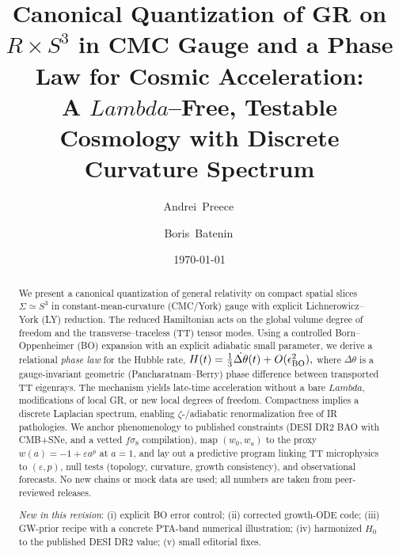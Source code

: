 \documentclass[aps,prd,twocolumn,amsmath,amssymb,nofootinbib,superscriptaddress]{revtex4-2}
\def\mathbb#1{#1}%
\def\mathcal#1{#1}%
\def\Lambda{Lambda}%
\begin{document}
\title{Canonical Quantization of GR on \texorpdfstring{$\mathbb{R}\!\times\! S^3$}{R x S3} in CMC Gauge and a Phase Law for Cosmic Acceleration:\\
A \texorpdfstring{$\Lambda$}{Lambda}--Free, Testable Cosmology with Discrete Curvature Spectrum}

\author{Andrei~Preece\,}

\author{Boris~Batenin\,}

\date{\today}

\begin{abstract}
We present a canonical quantization of general relativity on compact spatial slices $\Sigma\simeq S^3$ in constant-mean-curvature (CMC/York) gauge with explicit Lichnerowicz--York (LY) reduction. The reduced Hamiltonian acts on the global volume degree of freedom and the transverse--traceless (TT) tensor modes. Using a controlled Born--Oppenheimer (BO) expansion with an explicit adiabatic small parameter, we derive a relational \emph{phase law} for the Hubble rate,
\(
H(t)=\tfrac{1}{3}\dot{\Delta\theta}(t)+\mathcal{O}(\epsilon_{\rm BO}^2),
\)
where $\Delta\theta$ is a gauge-invariant geometric (Pancharatnam--Berry) phase difference between transported TT eigenrays. The mechanism yields late-time acceleration without a bare $\Lambda$, modifications of local GR, or new local degrees of freedom. Compactness implies a discrete Laplacian spectrum, enabling $\zeta$-/adiabatic renormalization free of IR pathologies. We anchor phenomenology to published constraints (DESI DR2 BAO with CMB+SNe, and a vetted $f\sigma_8$ compilation), map $(w_0,w_a)$ to the proxy $w(a)=-1+\varepsilon a^p$ at $a=1$, and lay out a predictive program linking TT microphysics to $(\varepsilon,p)$, null tests (topology, curvature, growth consistency), and observational forecasts. No new chains or mock data are used; all numbers are taken from peer-reviewed releases.

\emph{New in this revision}: (i) explicit BO error control; (ii) corrected growth-ODE code; (iii) GW-prior recipe with a concrete PTA-band numerical illustration; (iv) harmonized $H_0$ to the published DESI DR2 value; (v) small editorial fixes.
\end{abstract}

\maketitle
\end{document}
